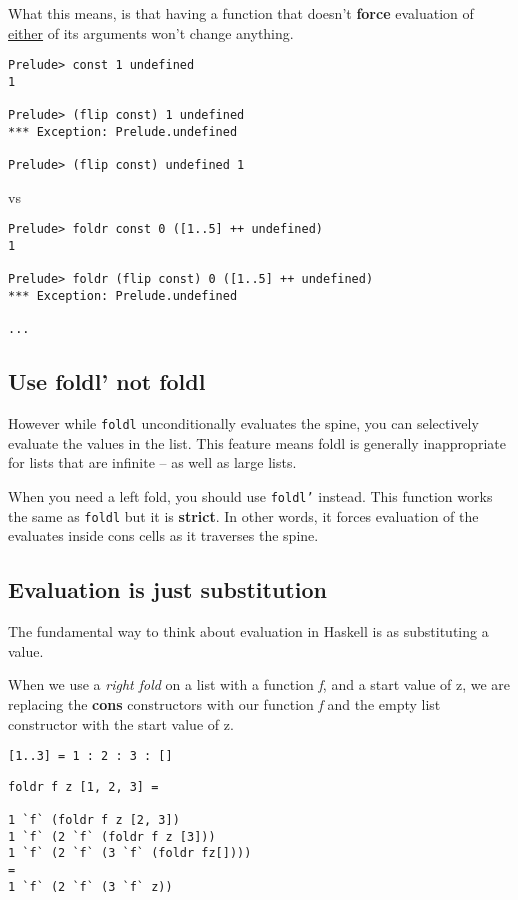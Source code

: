 What this means, is that having a function that doesn't \textbf{force} evaluation of \underline{either} of its arguments won't
change anything.

\begin{verbatim}
Prelude> const 1 undefined
1

Prelude> (flip const) 1 undefined
*** Exception: Prelude.undefined

Prelude> (flip const) undefined 1
\end{verbatim}

vs

\begin{verbatim}
Prelude> foldr const 0 ([1..5] ++ undefined)
1

Prelude> foldr (flip const) 0 ([1..5] ++ undefined)
*** Exception: Prelude.undefined

...
\end{verbatim}

\subsection{Use foldl' not foldl}
However while \texttt{foldl} unconditionally evaluates the spine, you can selectively evaluate the values in the list.
This feature means foldl is generally inappropriate for lists that are infinite -- as well as large lists.

When you need a left fold, you should use \texttt{foldl'} instead. This function works the same as \texttt{foldl} but it is \textbf{strict}.
In other words, it forces evaluation of the evaluates inside cons cells as it traverses the spine.


\subsection{Evaluation is just substitution}
The fundamental way to think about evaluation in Haskell is as substituting a value. 

When we use a \emph{right fold} on a list with a function \emph{f}, and a start value of z, we are replacing the \textbf{cons} constructors with our function \emph{f} and the empty list constructor with the start value of z.

\begin{verbatim}
[1..3] = 1 : 2 : 3 : []
\end{verbatim}

\begin{lstlisting}
foldr f z [1, 2, 3] =

1 `f` (foldr f z [2, 3])
1 `f` (2 `f` (foldr f z [3]))
1 `f` (2 `f` (3 `f` (foldr fz[])))
=
1 `f` (2 `f` (3 `f` z))
\end{lstlisting}


